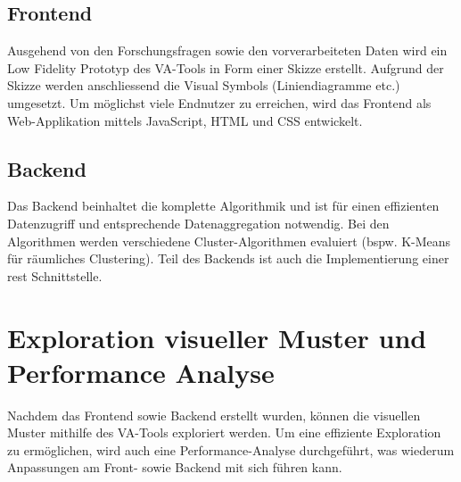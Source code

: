 \subsection{Frontend}
Ausgehend von den Forschungsfragen sowie den vorverarbeiteten Daten wird ein Low Fidelity Prototyp des VA-Tools in Form einer Skizze erstellt. Aufgrund der Skizze werden anschliessend die Visual Symbols (Liniendiagramme etc.) umgesetzt. Um möglichst viele Endnutzer zu erreichen, wird das Frontend als Web-Applikation mittels JavaScript, HTML und CSS entwickelt.

\subsection{Backend}
Das Backend beinhaltet die komplette Algorithmik und ist für einen effizienten Datenzugriff und entsprechende Datenaggregation notwendig. Bei den Algorithmen werden verschiedene Cluster-Algorithmen evaluiert (bspw. K-Means für räumliches Clustering). Teil des Backends ist auch die Implementierung einer \acrshort{rest} Schnittstelle.

\section{Exploration visueller Muster und Performance Analyse}
Nachdem das Frontend sowie Backend erstellt wurden, können die visuellen Muster mithilfe des VA-Tools exploriert werden. Um eine effiziente Exploration zu ermöglichen, wird auch eine Performance-Analyse durchgeführt, was wiederum Anpassungen am Front- sowie Backend mit sich führen kann.
